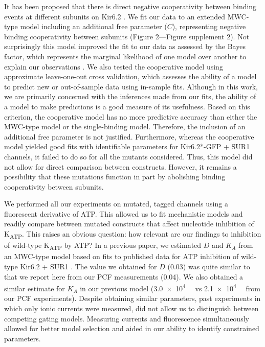 \documentclass[9pt,lineno, onehalfspacing]{elife_modified}
\begin{document}
It has been proposed that there is direct negative cooperativity between binding events at different subunits on Kir6.2 \citep{RN115}.
We fit our data to an extended MWC-type model including an additional free parameter ($C$), representing negative binding cooperativity between subunits (Figure 2—Figure supplement 2).
Not surprisingly this model improved the fit to our data as assessed by the Bayes factor, which represents the marginal likelihood of one model over another to explain our observations \citep{RN103, RN104}.
We also tested the cooperative model using approximate leave-one-out cross validation, which assesses the ability of a model to predict new or out-of-sample data using in-sample fits.
Although in this work, we are primarily concerned with the inferences made from our fits, the ability of a model to make predictions is a good measure of its usefulness.
Based on this criterion, the cooperative model has no more predictive accuracy than either the MWC-type model or the single-binding model.
Therefore, the inclusion of an additional free parameter is not justified.
Furthermore, whereas the cooperative model yielded good fits with identifiable parameters for Kir6.2*-GFP + SUR1 channels, it failed to do so for all the mutants considered.
Thus, this model did not allow for direct comparison between constructs.
However, it remains a possibility that these mutations function in part by abolishing binding cooperativity between subunits.

We performed all our experiments on mutated, tagged channels using a fluorescent derivative of ATP.
This allowed us to fit mechanistic models and readily compare between mutated constructs that affect nucleotide inhibition of K\textsubscript{ATP}.
This raises an obvious question: how relevant are our findings to inhibition of wild-type K\textsubscript{ATP} by ATP?
In a previous paper, we estimated $D$ and $K_A$ from an MWC-type model based on fits to published data for ATP inhibition of wild-type Kir6.2 + SUR1 \citep{RN28, RN3}.
The value we obtained for $D$ (0.03) was quite similar to that we report here from our PCF measurements (0.04).
We also obtained a similar estimate for $K_A$ in our previous model (\SI{3.0e4}{\per\Molar} vs \SI{2.1e4}{\per\Molar} from our PCF experiments).
Despite obtaining similar parameters, past experiments in which only ionic currents were measured, did not allow us to distinguish between competing gating models.
Measuring currents and fluorescence simultaneously allowed for better model selection and aided in our ability to identify constrained parameters.
\end{document}
